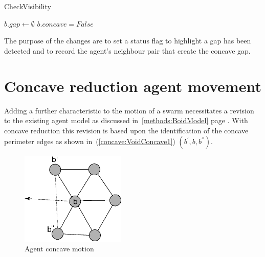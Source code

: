 \begin{algorithm}[H]
\DontPrintSemicolon
\SetAlgoLined
\caption{CheckVisibility}
$b.gap \leftarrow \emptyset$\;
$b.concave = False$\;
\label{algo:checkVisibility2}
\end{algorithm}

The purpose of the changes are to set a status flag to highlight a gap has been detected and to record the agent's neighbour pair that create the concave gap.

\section{Concave reduction agent movement}\label{concave:AgentMovement}
Adding a further characteristic to the motion of a swarm necessitates a revision to the existing agent model as discussed in~\autoref{methods:BoidModel} page \pageref{methods:BoidModel}. With concave reduction this revision is based upon the identification of the concave perimeter edges as shown in~(\autoref{concave:VoidConcave1}) $(b^{'},b,b^{''})$. 

\begin{figure}[H]
\begin{center}
\includegraphics[width=5cm]{CHAPTER-7/figures/VoidConcave1}
\end{center}
\caption{Agent concave motion\label{concave:VoidConcave1}}
\end{figure}


